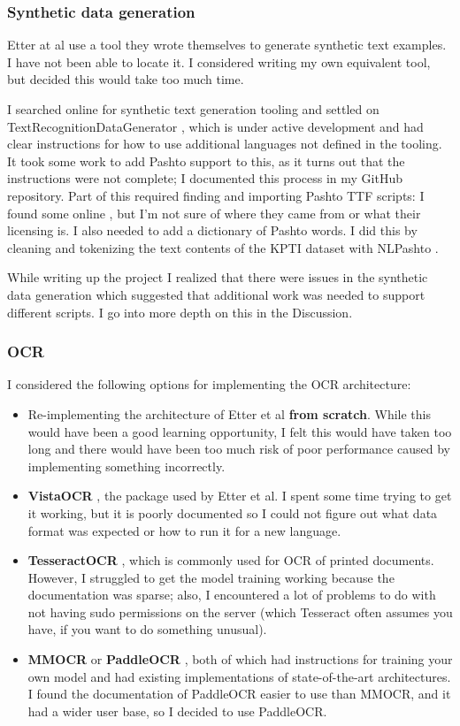 \documentclass[twocolumn,11pt]{extarticle}
\begin{document}
\subsubsection{Synthetic data generation}
Etter at al use a tool they wrote themselves to generate synthetic text examples. I have not been able to locate it. I considered writing my own equivalent tool, but decided this would take too much time. 

I searched online for synthetic text generation tooling and settled on TextRecognitionDataGenerator \cite{belval_belvaltextrecognitiondatagenerator_2024}, which is under active development and had clear instructions for how to use additional languages not defined in the tooling. It took some work to add Pashto support to this, as it turns out that the instructions were not complete; I documented this process in my GitHub repository. Part of this required finding and importing Pashto TTF scripts: I found some online \cite{zahidaz_zahidazpashto_fonts_2024}, but I'm not sure of where they came from or what their licensing is. I also needed to add a dictionary of Pashto words. I did this by cleaning and tokenizing the text contents of the KPTI dataset with NLPashto \cite{haq_nlpashto_2023}.

While writing up the project I realized that there were issues in the synthetic data generation which suggested that additional work was needed to support different scripts. I go into more depth on this in the Discussion. 

\subsubsection{OCR}
I considered the following options for implementing the OCR architecture:
\begin{itemize}
    \item Re-implementing the architecture of Etter et al {\bf from scratch}. While this would have been a good learning opportunity, I felt this would have taken too long and there would have been too much risk of poor performance caused by implementing something incorrectly. 
    \item \textbf{VistaOCR} \cite{noauthor_isi-vistavistaocr_2023}, the package used by Etter et al. I spent some time trying to get it working, but it is poorly documented so I could not figure out what data format was expected or how to run it for a new language.
    \item \textbf{TesseractOCR} \cite{smith_overview_2007}, which is commonly used for OCR of printed documents. However, I struggled to get the model training working because the documentation was sparse; also, I encountered a lot of problems to do with not having sudo permissions on the server (which Tesseract often assumes you have, if you want to do something unusual).
    \item \textbf{MMOCR} \cite{kuang_mmocr_2021} or \textbf{PaddleOCR} \cite{du_pp-ocr_2020}, both of which had instructions for training your own model and had existing implementations of state-of-the-art architectures. I found the documentation of PaddleOCR easier to use than MMOCR, and it had a wider user base, so I decided to use PaddleOCR.  
\end{itemize}
\end{document}
